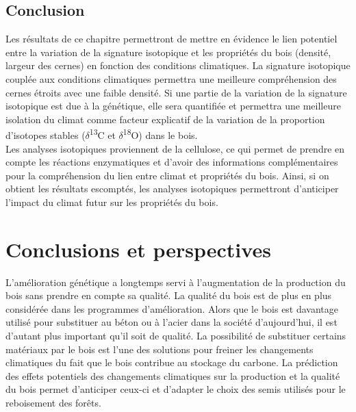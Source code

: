 \documentclass[a4paper,12pt]{report}
\newcommand{\Ctreize}{$\delta$\textsuperscript{13}C\xspace}
\newcommand{\Odixhuit}{$\delta$\textsuperscript{18}O\xspace}
\begin{document}
\section{Conclusion}

Les résultats de ce chapitre permettront de mettre en évidence le lien potentiel entre la variation de la signature isotopique et les propriétés du bois (densité, largeur des cernes) en fonction des conditions climatiques. La signature isotopique couplée aux conditions climatiques permettra une meilleure compréhension des cernes étroits avec une faible densité. Si une partie de la variation de la signature isotopique est due à la génétique, elle sera quantifiée et permettra une meilleure isolation du climat comme facteur explicatif de la variation de la proportion d'isotopes stables (\Ctreize et \Odixhuit) dans le bois.\\

Les analyses isotopiques proviennent de la cellulose, ce qui permet de prendre en compte les réactions enzymatiques et d'avoir des informations complémentaires pour la compréhension du lien entre climat et propriétés du bois. Ainsi, si on obtient les résultats escomptés, les analyses isotopiques permettront d'anticiper l'impact du climat futur sur les propriétés du bois. 

\clearpage %

\chapter*{Conclusions et perspectives}

L'amélioration génétique a longtemps servi à l'augmentation de la production du bois sans prendre en compte sa qualité. La qualité du bois est de plus en plus considérée dans les programmes d'amélioration. Alors que le bois est davantage utilisé pour substituer au  béton ou à l'acier dans la société d'aujourd'hui, il est d'autant plus important qu'il soit de qualité. La possibilité de substituer certains matériaux par le bois est l'une des solutions pour freiner les changements climatiques du fait que le bois contribue au stockage du carbone. La prédiction des effets potentiels des changements climatiques sur la production et la qualité du bois permet d'anticiper ceux-ci et d'adapter le choix des semis utilisés pour le reboisement des forêts. \\
\end{document}

